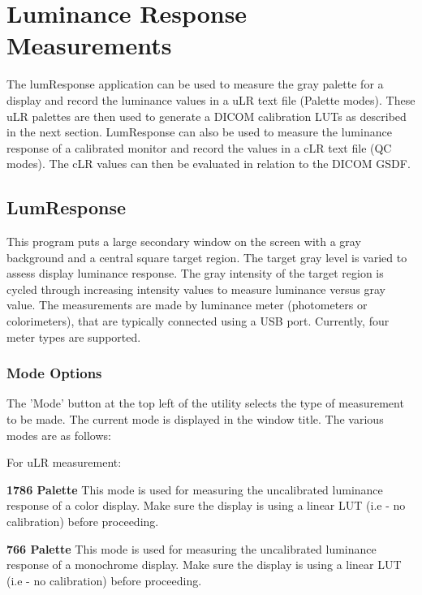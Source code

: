 %

\section{Luminance Response Measurements}
\label{sec:lumresponsemeasurements}

The lumResponse application can be used to measure the gray palette for a display and record the luminance values in a uLR text file (Palette modes). These uLR palettes are then used to generate a DICOM calibration LUTs as described in the next section. LumResponse can also be used to measure the luminance response of a calibrated monitor and record the values in a cLR text file (QC modes). The cLR values can then be evaluated in relation to the DICOM GSDF. 

\subsection{LumResponse}

This program puts a large secondary window on the screen with a gray background and a central square target region. The target gray level is varied to assess display luminance response. The gray intensity of the target region is cycled through increasing intensity values to measure luminance versus gray value. The measurements are made by luminance meter (photometers or colorimeters), that are typically connected using a USB port. Currently, four meter types are supported. 

\subsubsection{Mode Options}

The 'Mode' button at the top left of the utility selects the type of measurement to be made. The current mode is displayed in the window title. The various modes are as follows: 

For uLR measurement: 

\textbf{1786 Palette} This mode is used for measuring the uncalibrated luminance response of a color display. Make sure the display is using a linear LUT (i.e - no calibration) before proceeding. 

\textbf{766 Palette} This mode is used for measuring the uncalibrated luminance response of a mono\-chrome display. Make sure the display is using a linear LUT (i.e - no calibration) before proceeding. 

